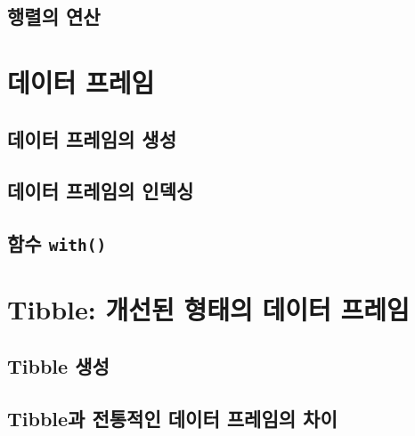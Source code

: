 \documentclass[
]{book}
\begin{document}
\hypertarget{uxd589uxb82cuxc758-uxc5f0uxc0b0}{%
\subsection{행렬의 연산}\label{uxd589uxb82cuxc758-uxc5f0uxc0b0}}

\hypertarget{section-dataframe}{%
\section{데이터 프레임}\label{section-dataframe}}

\hypertarget{uxb370uxc774uxd130-uxd504uxb808uxc784uxc758-uxc0dduxc131}{%
\subsection{데이터 프레임의 생성}\label{uxb370uxc774uxd130-uxd504uxb808uxc784uxc758-uxc0dduxc131}}

\hypertarget{uxb370uxc774uxd130-uxd504uxb808uxc784uxc758-uxc778uxb371uxc2f1}{%
\subsection{데이터 프레임의 인덱싱}\label{uxb370uxc774uxd130-uxd504uxb808uxc784uxc758-uxc778uxb371uxc2f1}}

\hypertarget{uxd568uxc218-with}{%
\subsection{\texorpdfstring{함수 \texttt{with()}}{함수 with()}}\label{uxd568uxc218-with}}

\hypertarget{tibble-uxac1cuxc120uxb41c-uxd615uxd0dcuxc758-uxb370uxc774uxd130-uxd504uxb808uxc784}{%
\section{Tibble: 개선된 형태의 데이터 프레임}\label{tibble-uxac1cuxc120uxb41c-uxd615uxd0dcuxc758-uxb370uxc774uxd130-uxd504uxb808uxc784}}

\hypertarget{tibble-uxc0dduxc131}{%
\subsection{Tibble 생성}\label{tibble-uxc0dduxc131}}

\hypertarget{tibbleuxacfc-uxc804uxd1b5uxc801uxc778-uxb370uxc774uxd130-uxd504uxb808uxc784uxc758-uxcc28uxc774}{%
\subsection{Tibble과 전통적인 데이터 프레임의 차이}\label{tibbleuxacfc-uxc804uxd1b5uxc801uxc778-uxb370uxc774uxd130-uxd504uxb808uxc784uxc758-uxcc28uxc774}}
\end{document}
